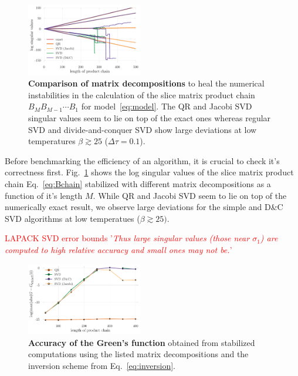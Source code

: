 \documentclass[%
 reprint,
superscriptaddress,
showpacs,
 amsmath,amssymb,
 aps,
 prb,
longbibliography,
]{revtex4-1}
\begin{document}
\begin{figure}
	\includegraphics[width=0.45\textwidth]{../notebooks/decomp_comparison_simple.pdf}
	\caption{\textbf{Comparison of matrix decompositions} to heal the numerical instabilities in the calculation of the slice matrix product chain $B_M B_{M-1} \cdots B_1$ for model~\eqref{eq:model}. The QR and Jacobi SVD singular values seem to lie on top of the exact ones whereas regular SVD and divide-and-conquer SVD show large deviations at low temperatures $\beta \gtrsim 25$ ($\Delta \tau = 0.1$). \label{fig:decomp_comparison_simple}}
\end{figure}

Before benchmarking the efficiency of an algorithm, it is crucial to check it's correctness first. Fig.~\ref{fig:decomp_comparison_simple} shows the log singular values of the slice matrix product chain Eq.~\ref{eq:Bchain} stabilized with different matrix decompositions as a function of it's length $M$. While QR and Jacobi SVD seem to lie on top of the numerically exact result, we observe large deviations for the simple and D\&C SVD algorithms at low temperatues ($\beta \gtrsim 25)$.

\textcolor{red}{LAPACK SVD error bounds\cite{errorbounds} '\textit{Thus large singular values (those near $\sigma_1$) are computed to high relative accuracy and small ones may not be.}'}\\

\begin{figure}[t]
	\includegraphics[width=0.45\textwidth]{../notebooks/accuracy_greens_svd_regularinv.pdf}
	\caption{\textbf{Accuracy of the Green's function} obtained from stabilized computations using the listed matrix decompositions and the inversion scheme from Eq.~\eqref{eq:inversion}. \label{fig:greens_accuracy_regularinv}}
\end{figure}
\end{document}
